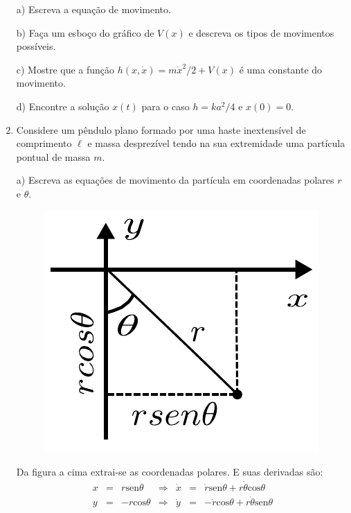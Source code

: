 \begin{enumerate}[start=1,label={\bfseries Q\arabic*.}]
a) Escreva a equação de movimento.

\resposta

b) Faça um esboço do gráfico de $V (x)$ e descreva os tipos de movimentos possíveis.

\resposta

c) Mostre que a função $h(x, \dot{x}) = m\dot{x}^{2} / 2 + V (x)$ é uma constante do movimento.

\resposta

d) Encontre a solução $x(t)$ para o caso $h = k a^{2} / 4$ e $x(0) = 0$.

\resposta



\item Considere um pêndulo plano formado por uma haste inextensível de comprimento $\ell$ e massa desprezível tendo na sua extremidade uma partícula pontual de massa $m$.

a) Escreva as equações de movimento da partícula em coordenadas polares $r$ e $\theta$.

\resposta

\begin{figure}[H]
\centering
\includegraphics[scale=0.6]{classica-img/pendulo1.pdf}
\end{figure}

Da figura a cima  extrai-se as coordenadas polares. E suas derivadas são:
$$
\begin{array}{ccccccc}
x & = & r \mathrm{sen} \theta & \Rightarrow & \dot{x} & = & \dot{r} \mathrm{sen} \theta + r \dot{\theta} \mathrm{cos} \theta \\
y & = & - r \mathrm{cos} \theta & \Rightarrow & \dot{y} & = & - \dot{r} \mathrm{cos} \theta + r \dot{\theta} \mathrm{sen} \theta
\end{array}
$$


\end{enumerate}
